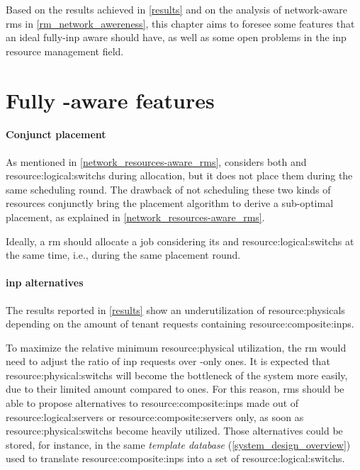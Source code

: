 Based on the results achieved in \autoref{results} and on the analysis of network-aware \glspl{rm} in \autoref{rm_network_awereness}, this chapter aims to foresee some features that an ideal fully-\gls{inp} aware should have, as well as some open problems in the \gls{inp} resource management field.

\section{Fully \texorpdfstring{}{INP}-aware \texorpdfstring{}{RM} features}

\paragraph{Conjunct placement}
As mentioned in \autoref{network_resources-aware_rms}, \cite{ontackling} considers both  and \glspl{resource:logical:switch} during allocation, but it does not place them during the same scheduling round.
The drawback of not scheduling these two kinds of resources conjunctly bring the placement algorithm to derive a sub-optimal placement, as explained in \autoref{network_resources-aware_rms}.

Ideally, a \gls{rm} should allocate a job considering its  and \glspl{resource:logical:switch} at the same time, i.e., during the same placement round.

\paragraph{\gls{inp} alternatives}
The results reported in \autoref{results} show an underutilization of \glspl{resource:physical} depending on the amount of tenant requests containing \glspl{resource:composite:inp}.

To maximize the relative minimum \gls{resource:physical} utilization, the \gls{rm} would need to adjust the ratio of \gls{inp} requests over -only ones.
It is expected that \glspl{resource:physical:switch} will become the bottleneck of the system more easily, due to their limited amount compared to  ones.
For this reason, \glspl{rm} should be able to propose alternatives to \glspl{resource:composite:inp} made out of \glspl{resource:logical:server} or \glspl{resource:composite:server} only, as soon as \glspl{resource:physical:switch} become heavily utilized.
Those alternatives could be stored, for instance, in the same \textit{template database} (\autoref{system_design_overview}) used to translate \glspl{resource:composite:inp} into a set of \glspl{resource:logical:switch}.


